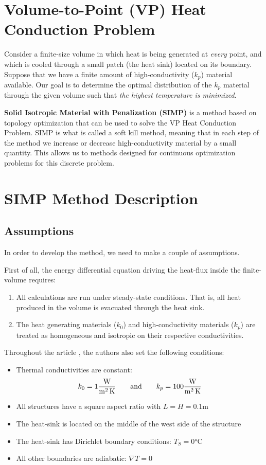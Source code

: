\documentclass[11pt]{article}
\begin{document}
\section{Volume-to-Point (VP) Heat Conduction Problem}

Consider a finite-size volume in which heat is being generated at \textit{every} point, and which is cooled through a small patch (the heat sink) located on its boundary. Suppose that we have a finite amount of high-conductivity ($k_p$) material available. Our goal is to determine the optimal distribution of the $k_p$ material through the given volume such that \textit{the highest temperature is minimized}.

{\color{tiananmen}\textbf{Solid Isotropic Material with Penalization (SIMP)}} is a method based on topology optimization that can be used to solve the VP Heat Conduction Problem. SIMP is what is called a {\color{baystate}soft kill method}, meaning that in each step of the method we increase or decrease high-conductivity material by a small quantity. This allows us to methods designed for continuous optimization problems for this discrete problem.

\section{SIMP Method Description}

\subsection{Assumptions}
In order to develop the method, we need to make a couple of assumptions.

First of all, the energy differential equation driving the heat-flux inside the finite-volume requires:
\begin{enumerate}
	\item All calculations are run under {\color{baystate}steady-state conditions}. That is, all heat produced in the volume is evacuated through the heat sink.
	\item The heat generating materials ($k_0$) and high-conductivity materials ($k_p$) are treated as {\color{baystate}homogeneous} and {\color{baystate}isotropic} on their respective conductivities.
\end{enumerate}

Throughout the article \cite{Marck2012}, the authors also set the following conditions:
\begin{itemize}
	\item Thermal conductivities are constant:
	$$k_0=1 \si[per-mode=fraction]{\watt\per\square\meter\per\kelvin}\qquad\text{and}\qquad k_p=100 \si[per-mode=fraction]{\watt\per\square\meter\per\kelvin}$$
	\item All structures have a square aspect ratio with $L=H=0.1\si{\meter}$
	\item The heat-sink is located on the middle of the west side of the structure
	\item The heat-sink has Dirichlet boundary conditions: $T_S=0\si{\celsius}$
	\item All other boundaries are adiabatic: $\nabla T=0$
\end{itemize}
\end{document}
